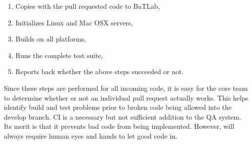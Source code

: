 \begin{enumerate}
    \item Copies \Cyclus with the pull requested code to BaTLab,
    \item Initializes Linux and Mac OSX servers,
    \item Builds \Cyclus on all platforms,
    \item Runs the complete \Cyclus test suite, 
    \item Reports back whether the above steps succeeded or not.
\end{enumerate}

Since these steps are performed for all incoming code, it is easy for the 
\Cyclus core team to determine whether or not an individual pull request 
actually works. This helps identify build and test problems prior to 
broken code being allowed into the develop branch. \gls{CI} is a necessary 
but not sufficient addition to the \Cyclus \gls{QA}
system. Its merit is that it prevents bad code from being implemented. However, \Cyclus will always
require human eyes and hands to let good code in.
